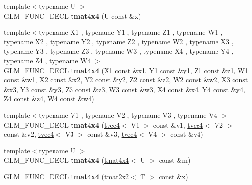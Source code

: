 \begin{DoxyCompactItemize}
\item 
\hypertarget{structglm_1_1detail_1_1tmat4x4_a7bba4efd49aa5ada36597d70b6bed499}{{\footnotesize template$<$typename U $>$ }\\G\-L\-M\-\_\-\-F\-U\-N\-C\-\_\-\-D\-E\-C\-L {\bfseries tmat4x4} (U const \&x)}\label{structglm_1_1detail_1_1tmat4x4_a7bba4efd49aa5ada36597d70b6bed499}

\item 
\hypertarget{structglm_1_1detail_1_1tmat4x4_a4c61a1ac0a751a92864d43c76ae7c838}{{\footnotesize template$<$typename X1 , typename Y1 , typename Z1 , typename W1 , typename X2 , typename Y2 , typename Z2 , typename W2 , typename X3 , typename Y3 , typename Z3 , typename W3 , typename X4 , typename Y4 , typename Z4 , typename W4 $>$ }\\G\-L\-M\-\_\-\-F\-U\-N\-C\-\_\-\-D\-E\-C\-L {\bfseries tmat4x4} (X1 const \&x1, Y1 const \&y1, Z1 const \&z1, W1 const \&w1, X2 const \&x2, Y2 const \&y2, Z2 const \&z2, W2 const \&w2, X3 const \&x3, Y3 const \&y3, Z3 const \&z3, W3 const \&w3, X4 const \&x4, Y4 const \&y4, Z4 const \&z4, W4 const \&w4)}\label{structglm_1_1detail_1_1tmat4x4_a4c61a1ac0a751a92864d43c76ae7c838}

\item 
\hypertarget{structglm_1_1detail_1_1tmat4x4_ad3cd8b58ae5da286e76933dc8f1f709e}{{\footnotesize template$<$typename V1 , typename V2 , typename V3 , typename V4 $>$ }\\G\-L\-M\-\_\-\-F\-U\-N\-C\-\_\-\-D\-E\-C\-L {\bfseries tmat4x4} (\hyperlink{structglm_1_1detail_1_1tvec4}{tvec4}$<$ V1 $>$ const \&v1, \hyperlink{structglm_1_1detail_1_1tvec4}{tvec4}$<$ V2 $>$ const \&v2, \hyperlink{structglm_1_1detail_1_1tvec4}{tvec4}$<$ V3 $>$ const \&v3, \hyperlink{structglm_1_1detail_1_1tvec4}{tvec4}$<$ V4 $>$ const \&v4)}\label{structglm_1_1detail_1_1tmat4x4_ad3cd8b58ae5da286e76933dc8f1f709e}

\item 
\hypertarget{structglm_1_1detail_1_1tmat4x4_ae796af70313184b6ca417007ab3df53d}{{\footnotesize template$<$typename U $>$ }\\G\-L\-M\-\_\-\-F\-U\-N\-C\-\_\-\-D\-E\-C\-L {\bfseries tmat4x4} (\hyperlink{structglm_1_1detail_1_1tmat4x4}{tmat4x4}$<$ U $>$ const \&m)}\label{structglm_1_1detail_1_1tmat4x4_ae796af70313184b6ca417007ab3df53d}

\item 
\hypertarget{structglm_1_1detail_1_1tmat4x4_a5ec3b38d6d69a8874513859052404851}{G\-L\-M\-\_\-\-F\-U\-N\-C\-\_\-\-D\-E\-C\-L {\bfseries tmat4x4} (\hyperlink{structglm_1_1detail_1_1tmat2x2}{tmat2x2}$<$ T $>$ const \&x)}\label{structglm_1_1detail_1_1tmat4x4_a5ec3b38d6d69a8874513859052404851}


\end{DoxyCompactItemize}
